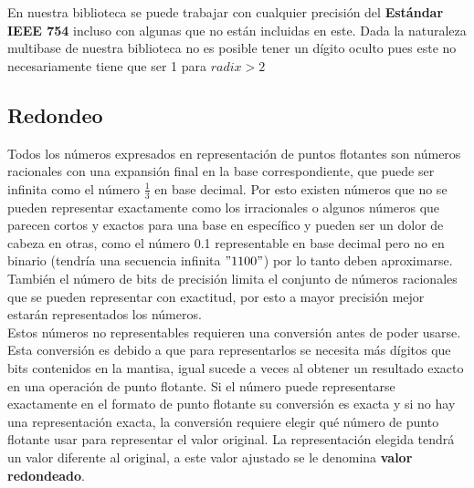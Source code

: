 \documentclass[a4paper,10pt,twocolumn]{article}
\begin{document}
	
	En nuestra biblioteca se puede trabajar con cualquier precisión del \textbf{Estándar IEEE 754} incluso con algunas que no están incluidas en este. Dada la naturaleza multibase de nuestra biblioteca no es posible tener un dígito oculto pues este  no necesariamente tiene que ser 1 para $radix > 2$\\  
	
	
	
	
	
	
	
	\subsection{Redondeo}
	
	Todos los números expresados en representación de puntos flotantes son números racionales con una expansión final en la base correspondiente, que puede ser infinita como el número $\frac{1}{3}$ en base decimal. Por esto existen números que no se pueden representar exactamente como los irracionales o algunos números que parecen cortos y exactos para una base en específico y pueden ser un dolor de cabeza en otras, como el número 0.1 representable en base decimal pero no en binario (tendría una secuencia infinita $"1100"$) por lo tanto deben aproximarse. También el número de bits de precisión limita el conjunto de números racionales que se pueden representar con exactitud, por esto a mayor precisión mejor estarán representados los números. \\
	
	Estos números no representables requieren una conversión antes de poder usarse. Esta conversión es debido a que para representarlos se necesita más dígitos que bits contenidos en la mantisa, igual sucede a veces al obtener un resultado exacto en una operación de punto flotante. Si el número puede representarse exactamente en el formato de punto flotante su conversión es exacta y si no hay una representación exacta, la conversión requiere elegir qué número de punto flotante usar para representar el valor original. La representación elegida tendrá un valor diferente al original, a este valor ajustado se le denomina \textbf{valor redondeado}.\\
	
\end{document}
